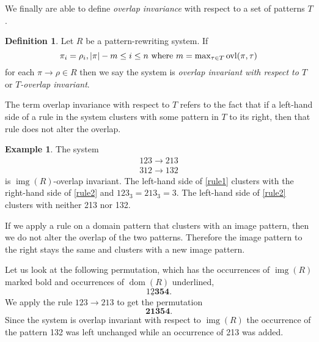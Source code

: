 \documentclass[a4paper, 11pt, english]{article}
\newcommand{\patternrule}{ \to \!}
\theoremstyle{definition}
\newtheorem{definition}[theorem]{Definition}
\newtheorem{example}[theorem]{Example}
\DeclareMathOperator{\dom}{dom}
\DeclareMathOperator{\img}{img}
\DeclareMathOperator{\ovl}{ovl}
\begin{document}
We finally are able to define \emph{overlap invariance} with respect to a set of patterns $T$.
\begin{definition}
    Let $R$ be a pattern-rewriting system. If
    \[
        \pi_i = \rho_i, |\pi|-m \leq i \leq n \  \textnormal{where}
        \ m = \max\nolimits_{\tau \in T} \ovl(\pi, \tau)
    \]
    for each $\pi \patternrule \rho \in R$
    then we say the system is \emph{overlap invariant with respect to $T$} or \emph{$T$-overlap
    invariant}.
\end{definition}

The term overlap invariance with respect to $T$ refers to the fact that if a left-hand side of a rule in the system clusters
with some pattern in $T$ to its right, then that rule does not alter the overlap.

\begin{example}
  The system
  \begin{align*}
    123 \patternrule 213 \label{rule1} \tag{1} \\
    312 \patternrule 132 \label{rule2} \tag{2}
  \end{align*}
  is $\img(R)$-overlap invariant. The left-hand side of \eqref{rule1} clusters with the right-hand side of
  \eqref{rule2} and $123_3 = 213_3 = 3$. The left-hand side of \eqref{rule2} clusters with neither 213 nor 132.

  If we apply a rule on a domain pattern that clusters with an image pattern, then we
  do not alter the overlap of the two patterns. Therefore the image pattern to the right stays the
  same and clusters with a new image pattern.
  
  Let us look at the following permutation, which has the occurrences of $\img(R)$ marked bold and
  occurrences of $\dom(R)$ underlined,
  \[
    \underline{12\bm{3}}\bm{54}.
  \]
  We apply the rule $123 \patternrule 213$ to get the permutation
  \[
    \bm{21\bm{3}}\bm{54}.
  \]
  Since the system is overlap invariant with respect to $\img(R)$ the occurrence of the pattern 132 was left unchanged while
  an occurrence of 213 was added.
\end{example}
\end{document}
